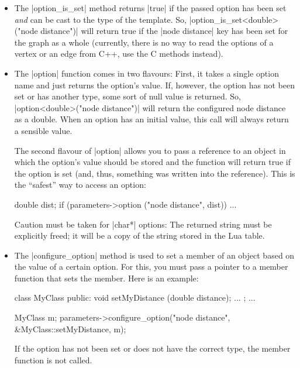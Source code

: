\begin{itemize}
    \item The |option_is_set| method returns |true| if the passed option has
        been set \emph{and} can be cast to the type of the template. So,
        |option_is_set<double>("node distance")| will return true if the
        |node distance| key has been set for the graph as a whole (currently,
        there is no way to read the options of a vertex or an edge from C++,
        use the C methods instead).
    \item The |option| function comes in two flavours: First, it takes a single
        option name and just returns the option's value. If, however, the
        option has not been set or has another type, some sort of null value is
        returned. So, |option<double>("node distance")| will return the
        configured node distance as a double. When an option has an initial
        value, this call will always return a sensible value.

        The second flavour of |option| allows you to pass a reference to an
        object in which the option's value should be stored and the function
        will return true if the option is set (and, thus, something was written
        into the reference). This is the ``safest'' way to access an option:
\begin{codeexample}[code only, tikz syntax=false]
double dist;
if (parameters->option ("node distance", dist))
  ...
\end{codeexample}

        Caution must be taken for |char*| options: The returned string must be
        explicitly freed; it will be a copy of the string stored in the Lua
        table.
    \item The |configure_option| method is used to set a member of an object
        based on the value of a certain option. For this, you must pass a
        pointer to a member function that sets the member. Here is an example:
\begin{codeexample}[code only, tikz syntax=false]
class MyClass {
public:
  void setMyDistance (double distance);
...
};
...

MyClass m;
parameters->configure_option("node distance", &MyClass::setMyDistance, m);
\end{codeexample}
        If the option has not been set or does not have the correct type, the
        member function is not called.
\end{itemize}


